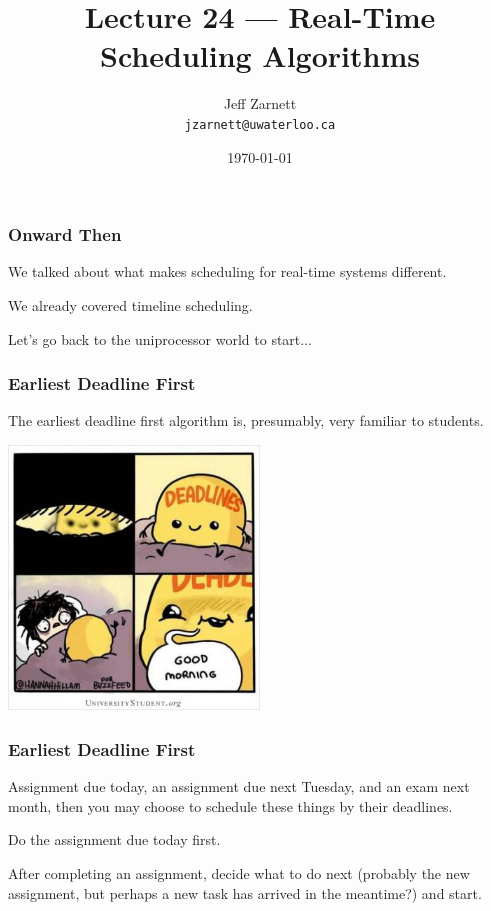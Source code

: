 

\title{Lecture  24 --- Real-Time Scheduling Algorithms }

\author{Jeff Zarnett \\ \small \texttt{jzarnett@uwaterloo.ca}}
\date{\today}




\begin{frame}
  \titlepage

 \end{frame}


\begin{frame}
\frametitle{Onward Then}

We talked about what makes scheduling for real-time systems different.

We already covered timeline scheduling.

Let's go back to the uniprocessor world to start...

\end{frame}


\begin{frame}
\frametitle{Earliest Deadline First}

The earliest deadline first algorithm is, presumably, very familiar to students. 

\begin{center}
	\includegraphics[width=0.5\textwidth]{images/deadlines.jpg}
\end{center}

\end{frame}


\begin{frame}
\frametitle{Earliest Deadline First}

Assignment due today, an assignment due next Tuesday, and an exam next month, then you may choose to schedule these things by their deadlines. 

Do the assignment due today first. 

After completing an assignment, decide what to do next (probably the new assignment, but perhaps a new task has arrived in the meantime?) and start.


\end{frame}

